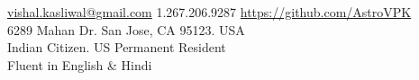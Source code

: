 \documentclass[10pt,a4paper]{article}
\begin{document}
\sloppy  %



\nobreakvspace{0.3em}  %

\noindent\href{mailto:vishal.dot.kasliwal.at.gmail.dot.com}{vishal.kasliwal\mbox{}@\mbox{}gmail.com}\sbull
\textsmaller{+}1.267.206.9287\sbull
\href{https://github.com/AstroVPK}{https://github.com/AstroVPK}
\\
6289 Mahan Dr.\sbull
San Jose, CA 95123.\sbull
USA
\\
Indian Citizen.\sbull
US Permanent Resident
\\
Fluent in English \& Hindi
\\
\spacedhrule{0.4em}{0.2em}  %
\end{document}
